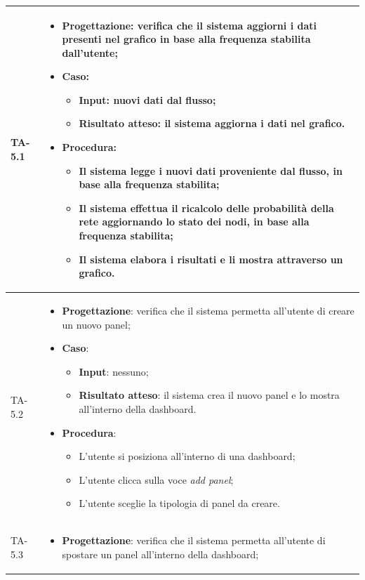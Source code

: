\begin{longtable}{|C{2.5cm}|C{13cm}|}
{TA-5.1} &
\begin{itemize}
	\item \textbf{Progettazione}: verifica che il sistema aggiorni i dati presenti nel grafico in base alla frequenza stabilita dall'utente;
	\item \textbf{Caso}: 
	\begin{itemize}
		\item \textbf{Input}: nuovi dati dal flusso;
		\item \textbf{Risultato atteso}: il sistema aggiorna i dati nel grafico.
	\end{itemize}
	\item \textbf{Procedura}:
	\begin{itemize}
		\item Il sistema legge i nuovi dati proveniente dal flusso, in base alla frequenza stabilita;
		\item Il sistema effettua il ricalcolo delle probabilità della rete aggiornando lo stato dei nodi, in base alla frequenza stabilita;
		\item Il sistema elabora i risultati e li mostra attraverso un grafico.
	\end{itemize} 
\end{itemize} \\
\hline
{TA-5.2} &
\begin{itemize}
	\item \textbf{Progettazione}: verifica che il sistema permetta all'utente di creare un nuovo panel;
	\item \textbf{Caso}: 
	\begin{itemize}
		\item \textbf{Input}: nessuno;
		\item \textbf{Risultato atteso}: il sistema crea il nuovo panel e lo mostra all'interno della dashboard.
	\end{itemize}
	\item \textbf{Procedura}:
	\begin{itemize}
		\item L'utente si posiziona all'interno di una dashboard;
		\item L'utente clicca sulla voce \emph{add panel};
		\item L'utente sceglie la tipologia di panel da creare.
	\end{itemize} 
\end{itemize} \\
\hline
{TA-5.3} &
\begin{itemize}
	\item \textbf{Progettazione}: verifica che il sistema permetta all'utente di spostare un panel all'interno della dashboard;

\end{itemize}
\end{longtable}
